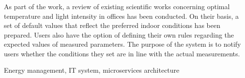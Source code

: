 \documentclass[
    left=2.5cm,         %
    right=2.5cm,        %
    top=2.5cm,          %
    bottom=3cm,         %
    bindingoffset=6mm,  %
    nohyphenation=false %
]{eiti/eiti-thesis}
\begin{document}
As part of the work, a review of existing scientific works concerning optimal
temperature and light intensity in offices has been conducted. On their basis, a set
of default values that reflect the preferred indoor conditions has been prepared.
Users also have the option of defining their own rules regarding the expected
values of measured parameters. The purpose of the system is to notify users
whether the conditions they set are in line with the actual measurements.


\keywords Energy management, IT system, microservices architecture

\cleardoublepage  %
\pagestyle{plain}
\makeauthorship

\cleardoublepage %
\tableofcontents

\cleardoublepage %
\pagestyle{headings}









\cleardoublepage %
\printbibliography

\newpage
\pagestyle{plain}

\vspace{0.8cm}
\acronymlist
{}
\end{document}
